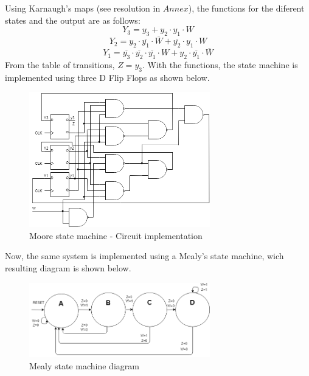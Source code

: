 Using Karnaugh's maps (see resolution in $Annex$), the functions for
the diferent states and the output are as follows:
$$Y_3 = y_3 + y_2 \cdot y_1 \cdot W$$ 
$$Y_2 = y_2 \cdot \overline{y_1} \cdot \overline{W} + \overline{y_2} \cdot y_1 \cdot W $$
$$Y_1 = \overline{y_3} \cdot \overline{y_2} \cdot \overline{y_1} \cdot W + y_2 \cdot \overline{y_1} \cdot \overline{W}$$
From the table of transitions, $Z = y_3$.
\newpage
With the functions, the state machine is 
implemented using three D Flip Flops as shown below.

\begin{figure}[H]
    \begin{centering}
    \includegraphics[width=0.7\textwidth]{data/Graficos2/2a_Compuertas_Moore.png}
    \par\end{centering}
    \caption{Moore state machine  - Circuit implementation}
\end{figure}

Now, the same system is implemented using a Mealy's 
state machine, wich resulting diagram is shown below.

\begin{figure}[H]
    \begin{centering}
    \includegraphics[width=0.7\textwidth]{data/Graficos2/2b_fsm.png}
    \par\end{centering}
    \caption{Mealy state machine diagram}
\end{figure}

